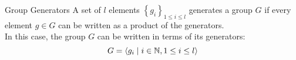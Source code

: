 \begin{frame}{Group Generators}
    A set of \(l\) elements \(\left\{g_i\right\}_{1\leq i\leq l}\)
    generates a group \(G\) if every element \(g\in G\) can be written as a product of the generators. \\
    In this case, the group \(G\) can be written in terms of its generators:
    \[
        G=\left\langle g_i\mid i\in\operatorname{\mathbb{N}},1\leq i\leq l\right\rangle
    \]

    \vspace*{25mm}

\end{frame}